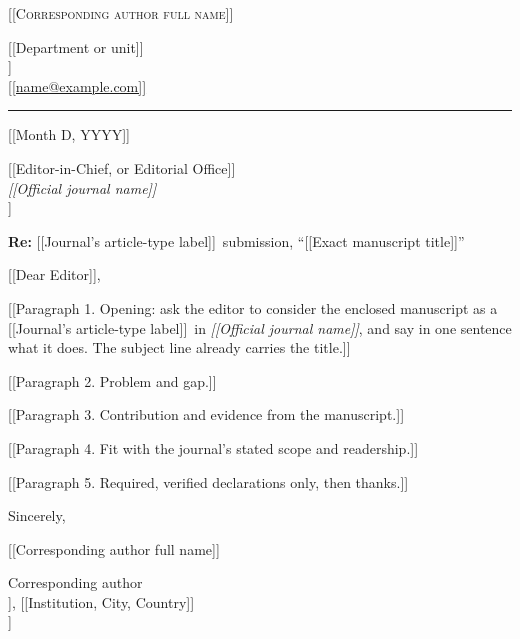 \documentclass[11pt]{article}
\makeatletter
\newcommand{\LetterDate}{[[Month D, YYYY]]}
\newcommand{\RecipientName}{[[Editor-in-Chief, or Editorial Office]]}
\newcommand{\JournalName}{[[Official journal name]]}
\newcommand{\Publisher}{[[Publisher]]}
\newcommand{\Salutation}{[[Dear Editor]]}
\newcommand{\ArticleType}{[[Journal's article-type label]]}
\newcommand{\ManuscriptTitle}{[[Exact manuscript title]]}
\newcommand{\AuthorName}{[[Corresponding author full name]]}
\newcommand{\AuthorDept}{[[Department or unit]]}
\newcommand{\AuthorInstitution}{[[Institution, City, Country]]}
\newcommand{\AuthorEmail}{[[name@example.com]]}
\newcommand{\Contact}[1]{{\small\color{muted}#1\par}}
\makeatother
\begin{document}
{\color{accent}\Large\scshape \AuthorName\par}
\vspace{2pt}
\Contact{\AuthorDept\\ \AuthorInstitution\\ \href{mailto:\AuthorEmail}{\AuthorEmail}}
\vspace{-4pt}
{\color{accent}\rule{\linewidth}{0.6pt}}

\LetterDate

{\RecipientName\\ \emph{\JournalName}\\ \Publisher\par}

{\raggedright{} %
{\color{accent}\textbf{Re:}} \ArticleType\ submission, ``\ManuscriptTitle''\par}

\Salutation,

[[Paragraph 1. Opening: ask the editor to consider the enclosed manuscript as a \ArticleType\ in \emph{\JournalName}, and say in one sentence what it does. The subject line already carries the title.]]

[[Paragraph 2. Problem and gap.]]

[[Paragraph 3. Contribution and evidence from the manuscript.]]

[[Paragraph 4. Fit with the journal's stated scope and readership.]]

[[Paragraph 5. Required, verified declarations only, then thanks.]]

Sincerely,

\vspace{0.6\baselineskip}
{\AuthorName\par}
\Contact{Corresponding author\\ \AuthorDept, \AuthorInstitution\\ \AuthorEmail}
\end{document}
